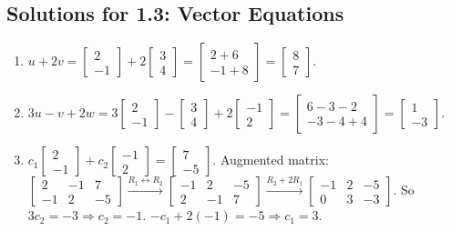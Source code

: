 \documentclass[12pt]{article}
\begin{document}
\subsection{Solutions for 1.3: Vector Equations}
\begin{enumerate}
    \item $u + 2v = \begin{bmatrix} 2 \\ -1 \end{bmatrix} + 2\begin{bmatrix} 3 \\ 4 \end{bmatrix} = \begin{bmatrix} 2+6 \\ -1+8 \end{bmatrix} = \begin{bmatrix} 8 \\ 7 \end{bmatrix}$.
    \item $3u - v + 2w = 3\begin{bmatrix} 2 \\ -1 \end{bmatrix} - \begin{bmatrix} 3 \\ 4 \end{bmatrix} + 2\begin{bmatrix} -1 \\ 2 \end{bmatrix} = \begin{bmatrix} 6-3-2 \\ -3-4+4 \end{bmatrix} = \begin{bmatrix} 1 \\ -3 \end{bmatrix}$.
    \item $c_1\begin{bmatrix} 2 \\ -1 \end{bmatrix} + c_2\begin{bmatrix} -1 \\ 2 \end{bmatrix} = \begin{bmatrix} 7 \\ -5 \end{bmatrix}$. Augmented matrix: $\begin{bmatrix} 2 & -1 & 7 \\ -1 & 2 & -5 \end{bmatrix} \xrightarrow{R_1 \leftrightarrow R_2} \begin{bmatrix} -1 & 2 & -5 \\ 2 & -1 & 7 \end{bmatrix} \xrightarrow{R_2+2R_1} \begin{bmatrix} -1 & 2 & -5 \\ 0 & 3 & -3 \end{bmatrix}$. So $3c_2 = -3 \Rightarrow c_2 = -1$. $-c_1 + 2(-1) = -5 \Rightarrow c_1 = 3$.
    

\end{enumerate}
\end{document}
